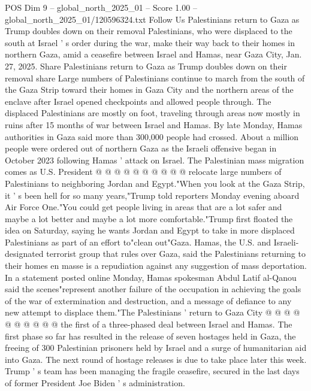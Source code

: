 \begin{textsample}{POS Dim 9 – global\_north\_2025\_01 – Score 1.00 – global\_north\_2025\_01/120596324.txt}  \label{ex:f9_pos_417}
Follow Us Palestinians return to Gaza as Trump doubles down on their removal Palestinians, who were displaced to the south at Israel ' s order during the war, make their way back to their homes in northern Gaza, amid a ceasefire between Israel and Hamas, near Gaza City, Jan. 27, 2025.
Share Palestinians return to Gaza as Trump doubles down on their removal share Large numbers of Palestinians continue to march from the south of the Gaza Strip toward their homes in Gaza City and the northern areas of the enclave after Israel opened checkpoints and allowed people through.
The displaced Palestinians are mostly on foot, traveling through areas now mostly in ruins after 15 months of war between Israel and Hamas.
By late Monday, Hamas authorities in Gaza said more than 300,000 people had crossed.
About a million people were ordered out of northern Gaza as the Israeli offensive began in October 2023 following Hamas ' attack on Israel.
The Palestinian mass migration comes as U.S.
President @ @ @ @ @ @ @ @ @ @ relocate large numbers of Palestinians to neighboring Jordan and Egypt."When you look at the Gaza Strip, it ' s been hell for so many years,"Trump told reporters Monday evening aboard Air Force One."You could get people living in areas that are a lot safer and maybe a lot better and maybe a lot more comfortable."Trump first floated the idea on Saturday, saying he wants Jordan and Egypt to take in more displaced Palestinians as part of an effort to"clean out"Gaza.
Hamas, the U.S. and Israeli-designated terrorist group that rules over Gaza, said the Palestinians returning to their homes en masse is a repudiation against any suggestion of mass deportation.
In a statement posted online Monday, Hamas spokesman Abdul Latif al-Qanou said the scenes"represent another failure of the occupation in achieving the goals of the war of extermination and destruction, and a message of defiance to any new attempt to displace them."The Palestinians ' return to Gaza City @ @ @ @ @ @ @ @ @ @ the first of a three-phased deal between Israel and Hamas.
The first phase so far has resulted in the release of seven hostages held in Gaza, the freeing of 300 Palestinian prisoners held by Israel and a surge of humanitarian aid into Gaza.
The next round of hostage releases is due to take place later this week.
Trump ' s team has been managing the fragile ceasefire, secured in the last days of former President Joe Biden ' s administration.

\end{textsample}
